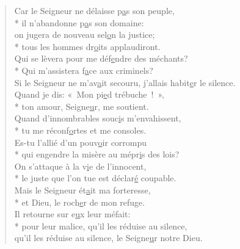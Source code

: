 \begin{verse}
Car le Seigneur ne délaisse p\underline{a}s son peuple, \\*
il n’abandonne p\underline{a}s son domaine: \\
on jugera de nouveau sel\underline{o}n la justice; \\*
tous les hommes dr\underline{o}its applaudiront. \\

Qui se lèvera pour me déf\underline{e}ndre des méchants? \\*
Qui m’assistera f\underline{a}ce aux criminels? \\
Si le Seigneur ne m’av\underline{a}it secouru,\psalmstar
j’allais habit\underline{e}r le silence. \\

Quand je dis: « Mon pi\underline{e}d trébuche ! », \\*
ton amour, Seigne\underline{u}r, me soutient. \\
Quand d’innombrables souc\underline{i}s m’envahissent, \\*
tu me réconf\underline{o}rtes et me consoles. \\

Es-tu l’allié d’un pouv\underline{o}ir corrompu \\*
qui engendre la misère au mépr\underline{i}s des lois? \\
On s’attaque à la v\underline{i}e de l’innocent, \\*
le juste que l’on tue est déclar\underline{é} coupable. \\

Mais le Seigneur ét\underline{a}it ma forteresse, \\*
et Dieu, le roch\underline{e}r de mon refuge. \\
Il retourne sur e\underline{u}x leur méfait: \\*
pour leur malice, qu’il les réduise au silence, \\
qu’il les réduise au silence, le Seigne\underline{u}r notre Dieu. \\
\end{verse}

